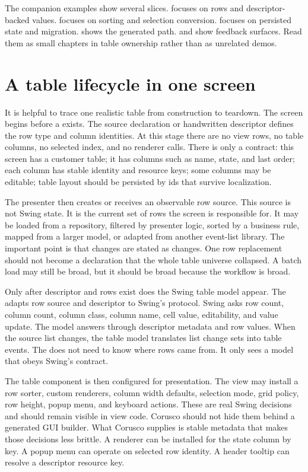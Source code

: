 The companion examples show several slices. 
focuses on rows and descriptor-backed values. 
focuses on sorting and selection conversion.  focuses
on persisted state and migration.  shows the
generated path.  and
 show feedback surfaces. Read them as small
chapters in table ownership rather than as unrelated demos.

\section{A table lifecycle in one screen}

It is helpful to trace one realistic table from construction to teardown. The
screen begins before a  exists. The source declaration or
handwritten descriptor defines the row type and column identities. At this
stage there are no view rows, no table columns, no selected index, and no
renderer calls. There is only a contract: this screen has a customer table;
it has columns such as name, state, and last order; each column has stable
identity and resource keys; some columns may be editable; table layout should
be persisted by ids that survive localization.

The presenter then creates or receives an observable row source. This source
is not Swing state. It is the current set of rows the screen is responsible
for. It may be loaded from a repository, filtered by presenter logic, sorted
by a business rule, mapped from a larger model, or adapted from another
event-list library. The important point is that changes are stated as changes.
One row replacement should not become a declaration that the whole table
universe collapsed. A batch load may still be broad, but it should be broad
because the workflow is broad.

Only after descriptor and rows exist does the Swing table model appear. The
 adapts row source and descriptor to Swing's
 protocol. Swing asks row count, column count, column class,
column name, cell value, editability, and value update. The model answers
through descriptor metadata and row values. When the source list changes, the
table model translates list change sets into table events. The 
does not need to know where rows came from. It only sees a model that obeys
Swing's contract.

The table component is then configured for presentation. The view may install
a row sorter, custom renderers, column width defaults, selection mode, grid
policy, row height, popup menu, and keyboard actions. These are real Swing
decisions and should remain visible in view code. Corusco should not hide them
behind a generated GUI builder. What Corusco supplies is stable metadata that
makes those decisions less brittle. A renderer can be installed for the state
column by key. A popup menu can operate on selected row identity. A header
tooltip can resolve a descriptor resource key.


